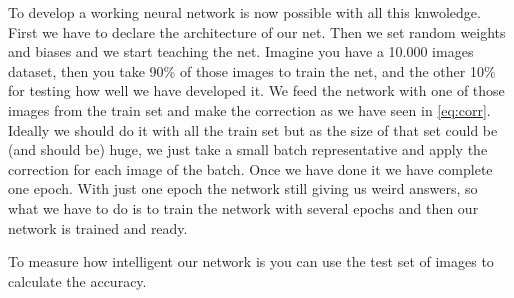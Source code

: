 To develop a working neural network is now possible with all this knwoledge. First we have to declare the architecture of our net. Then we set random weights and biases and we start teaching the net. Imagine you have a 10.000 images dataset, then you take 90\% of those images to train the net, and the other 10\% for testing how well we have developed it. We feed the network with one of those images from the train set and make the correction as we have seen in \ref{eq:corr}. Ideally we should do it with all the train set but as the size of that set could be (and should be) huge, we just take a small batch representative and apply the correction for each image of the batch. Once we have done it we have complete one epoch. With just one epoch the network still giving us weird answers, so what we have to do is to train the network with several epochs and then our network is trained and ready.

To measure how intelligent our network is you can use the test set of images to calculate the accuracy.
